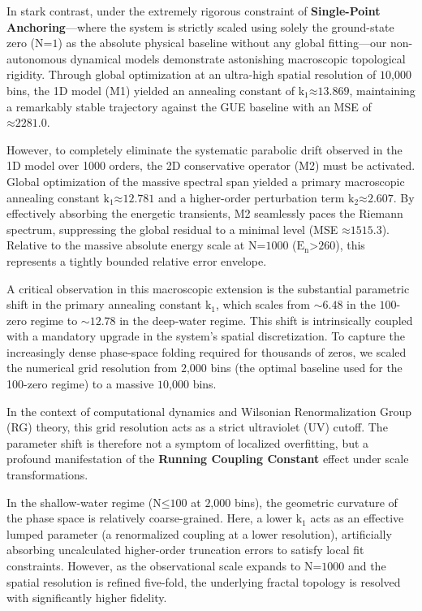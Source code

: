 In stark contrast, under the extremely rigorous constraint of
\textbf{Single-Point Anchoring}---where the system is strictly scaled
using solely the ground-state zero (\(\text{N}\text{=1}\)) as the
absolute physical baseline without any global fitting---our
non-autonomous dynamical models demonstrate astonishing macroscopic
topological rigidity. Through global optimization at an ultra-high
spatial resolution of \(\text{10,000}\) bins, the 1D model (M1) yielded
an annealing constant of \(\text{k}_{\text{1}}\text{≈13.869}\),
maintaining a remarkably stable trajectory against the GUE baseline with
an MSE of \(\text{≈2281.0}\).

However, to completely eliminate the systematic parabolic drift observed
in the 1D model over 1000 orders, the 2D conservative operator (M2) must
be activated. Global optimization of the massive spectral span yielded a
primary macroscopic annealing constant
\(\text{k}_{\text{1}}\text{≈12.781}\) and a higher-order perturbation
term \(\text{k}_{\text{2}}\text{≈2.607}\). By effectively absorbing the
energetic transients, M2 seamlessly paces the Riemann spectrum,
suppressing the global residual to a minimal level (MSE
\(\text{≈1515.3}\)). Relative to the massive absolute energy scale at
\(\text{N}\text{=1000}\) (\(\text{E}_{\text{n}}\text{>260}\)), this
represents a tightly bounded relative error envelope.

A critical observation in this macroscopic extension is the substantial
parametric shift in the primary annealing constant
\(\text{k}_{\text{1}}\), which scales from \(\text{∼6.48}\) in the
\(\text{100}\)-zero regime to \(\text{∼12.78}\) in the deep-water
regime. This shift is intrinsically coupled with a mandatory upgrade in
the system's spatial discretization. To capture the increasingly dense
phase-space folding required for thousands of zeros, we scaled the
numerical grid resolution from \(\text{2,000}\) bins (the optimal
baseline used for the 100-zero regime) to a massive \(\text{10,000}\)
bins.

In the context of computational dynamics and Wilsonian Renormalization
Group (RG) theory, this grid resolution acts as a strict ultraviolet
(UV) cutoff. The parameter shift is therefore not a symptom of localized
overfitting, but a profound manifestation of the \textbf{Running
Coupling Constant} effect under scale transformations.

In the shallow-water regime (\(\text{N}\text{≤100}\) at \(\text{2,000}\)
bins), the geometric curvature of the phase space is relatively
coarse-grained. Here, a lower \(\text{k}_{\text{1}}\) acts as an
effective lumped parameter (a renormalized coupling at a lower
resolution), artificially absorbing uncalculated higher-order truncation
errors to satisfy local fit constraints. However, as the observational
scale expands to \(\text{N}\text{=1000}\) and the spatial resolution is
refined five-fold, the underlying fractal topology is resolved with
significantly higher fidelity.


